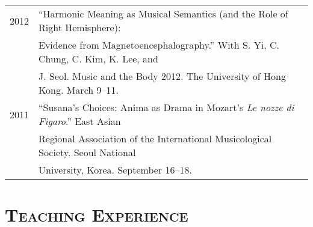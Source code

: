 \documentclass[letter,11pt]{article}
\begin{document}
  \hspace*{-0.25cm}
  \begin{tabular}{p{2.5cm} p{12.5cm}}
    2012 & “Harmonic Meaning as Musical Semantics (and the Role of Right
    Hemisphere):\\
    & Evidence from Magnetoencephalography.” With S. Yi, C. Chung, C. Kim, K.
    Lee, and\\
    & J. Seol. Music and the Body 2012. The University of Hong Kong. March
    9–11.\\[2mm]
  
    2011 & “Susana’s Choices: Anima as Drama in Mozart’s \textit{Le nozze di
    Figaro}.” East Asian\\
    & Regional Association of the International Musicological Society. Seoul
    National\\
    & University, Korea. September 16–18.
    
  \end{tabular}
  
  
  \section*{\textsc{Teaching Experience}}
  
\end{document}
